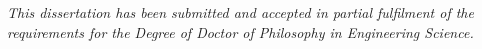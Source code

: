 
\vspace*{\fill}
\vspace*{\fill}
\vspace*{\fill}
\begin{center}
\textit{
This dissertation has been submitted and accepted in partial fulfilment of
the requirements for the Degree of Doctor of Philosophy in
Engineering Science.
}
\end{center}

\vspace*{\fill}
\vspace*{\fill}
\vspace*{\fill}
